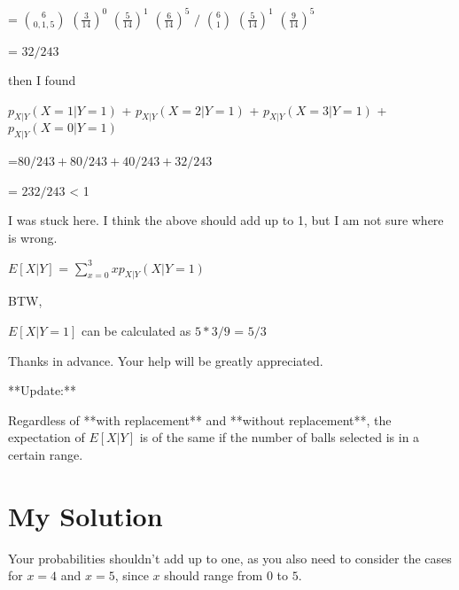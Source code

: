 \documentclass{article}
\begin{document}
= ${6\choose 0, 1, 5}$ $(\frac{3}{14})^0$ $(\frac{5}{14})^1$ $(\frac{6}{14})^5$ 
$/$ ${6\choose 1}$ $(\frac{5}{14})^1$ $(\frac{9}{14})^5$

= $32/243$

then I found 

$p_{X|Y}(X = 1|Y = 1)$ + $p_{X|Y}(X = 2|Y = 1)$ + $p_{X|Y}(X = 3|Y = 1)$ + $p_{X|Y}(X = 0|Y = 1)$


=$80/243 + 80/243 + 40/243 + 32/243$  

= $232/243$    < 1

I was stuck here. I think the above should add up to 1, but I am not sure where is wrong.

$E[X|Y]$ = $\sum_{x=0}^3 x p_{X|Y}(X|Y = 1)$



BTW, 

$E[X|Y = 1]$ can be calculated as  $5 * 3/9$ = $5/3$

Thanks in advance. Your help will be greatly appreciated.

**Update:**

Regardless of **with replacement** and **without replacement**, the expectation of $E[X|Y]$ is of the same if the number of balls selected is in a certain range.
\section{My Solution}
Your probabilities shouldn't add up to one, as you also need to consider the cases for $x=4$ and $x=5$, since $x$ should range from $0$ to $5$.
\end{document}

